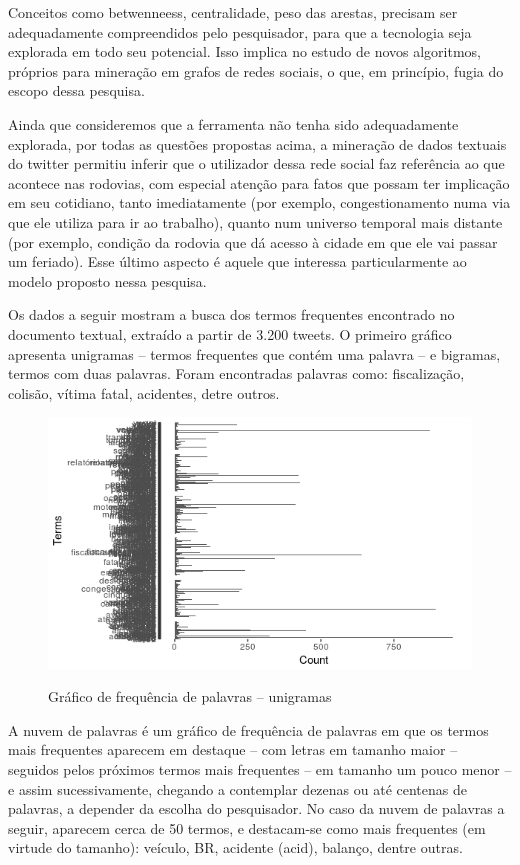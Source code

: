 Conceitos como betwenneess, centralidade, peso das arestas, precisam ser adequadamente compreendidos pelo pesquisador, para que a tecnologia seja explorada em todo seu potencial. Isso implica no estudo de novos algoritmos, próprios para mineração em grafos de redes sociais, o que, em princípio, fugia do escopo dessa pesquisa.

Ainda que consideremos que a ferramenta não tenha sido adequadamente explorada, por todas as questões propostas acima, a mineração de dados textuais do twitter permitiu inferir que o utilizador dessa rede social faz referência ao que acontece nas rodovias, com especial atenção para fatos que possam ter implicação em seu cotidiano, tanto imediatamente (por exemplo, congestionamento numa via que ele utiliza para ir ao trabalho), quanto num universo temporal mais distante (por exemplo, condição da rodovia que dá acesso à cidade em que ele vai passar um feriado). Esse último aspecto é aquele que interessa particularmente ao modelo proposto nessa pesquisa.

Os dados a seguir mostram a busca dos termos frequentes encontrado no documento textual, extraído a partir de 3.200 tweets. O primeiro gráfico apresenta unigramas -- termos frequentes que contém uma palavra -- e bigramas, termos com duas palavras. Foram encontradas palavras como: fiscalização, colisão, vítima fatal, acidentes, detre outros. 

\pagebreak

\begin{figure}
\centering
\caption{Gráfico de frequência de palavras -- unigramas}
\includegraphics[width=0.9\linewidth]{Figuras/Twitter/freqPalavras}
\label{fig:freqPalavras}
\end{figure}

\quad

A nuvem de palavras é um gráfico de frequência de palavras em que os termos mais frequentes aparecem em destaque -- com letras em tamanho maior -- seguidos pelos próximos termos mais frequentes -- em tamanho um pouco menor -- e assim sucessivamente, chegando a contemplar dezenas ou até centenas de palavras, a depender da escolha do pesquisador. No caso da nuvem de palavras a seguir, aparecem cerca de 50 termos, e destacam-se como mais frequentes (em virtude do tamanho): veículo, BR, acidente (acid), balanço, dentre outras. 

